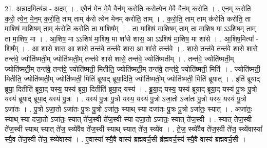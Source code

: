 \documentclass[17pt]{extarticle}
\begin{document}
21. अ॒न्ना॒दमित्य॑न्न - अ॒दम् । . ए॒वैन॑ मेन मे॒वै वैन॑म् करोति करोत्येन मे॒वै वैन॑म् करोति । . ए॒न॒म् क॒रो॒ति॒ क॒रो॒ त्ये॒न॒ मे॒न॒म् क॒रो॒ति॒ ताम् ताम् क॑रो त्येन मेनम् करोति॒ ताम् । . क॒रो॒ति॒ ताम् ताम् क॑रोति करोति॒ ता मा॒शिष॑ मा॒शिष॒म् ताम् क॑रोति करोति॒ ता मा॒शिष᳚म् । . ता मा॒शिष॑ मा॒शिष॒म् ताम् ता मा॒शिष॒ मा ऽऽशिष॒म् ताम् ता मा॒शिष॒ मा । . आ॒शिष॒ मा ऽऽशिष॑ मा॒शिष॒ मा शा॑से शास॒ आ ऽऽशिष॑ मा॒शिष॒ मा शा॑से । . आ॒शिष॒मित्या᳚ - शिष᳚म् । . आ शा॑से शास॒ आ शा॑से॒ तन्त॑वे॒ तन्त॑वे शास॒ आ शा॑से॒ तन्त॑वे । . शा॒से॒ तन्त॑वे॒ तन्त॑वे शासे शासे॒ तन्त॑वे॒ ज्योति॑ष्मती॒म् ज्योति॑ष्मती॒म् तन्त॑वे शासे शासे॒ तन्त॑वे॒ ज्योति॑ष्मतीम् । . तन्त॑वे॒ ज्योति॑ष्मती॒म् ज्योति॑ष्मती॒म् तन्त॑वे॒ तन्त॑वे॒ ज्योति॑ष्मती॒ मितीति॒ ज्योति॑ष्मती॒म् तन्त॑वे॒ तन्त॑वे॒ ज्योति॑ष्मती॒ मिति॑ । . ज्योति॑ष्मती॒ मितीति॒ ज्योति॑ष्मती॒म् ज्योति॑ष्मती॒ मिति॑ ब्रूयाद् ब्रूया॒दिति॒ ज्योति॑ष्मती॒म् ज्योति॑ष्मती॒ मिति॑ ब्रूयात् । . इति॑ ब्रूयाद् ब्रूया॒ दितीति॑ ब्रूया॒द् यस्य॒ यस्य॑ ब्रूया॒ दितीति॑ ब्रूया॒द् यस्य॑ । . ब्रू॒या॒द् यस्य॒ यस्य॑ ब्रूयाद् ब्रूया॒द् यस्य॑ पु॒त्रः पु॒त्रो यस्य॑ ब्रूयाद् ब्रूया॒द् यस्य॑ पु॒त्रः । . यस्य॑ पु॒त्रः पु॒त्रो यस्य॒ यस्य॑ पु॒त्रो ऽजा॒तो ऽजा॑तः पु॒त्रो यस्य॒ यस्य॑ पु॒त्रो ऽजा॑तः । . पु॒त्रो ऽजा॒तो ऽजा॑तः पु॒त्रः पु॒त्रो ऽजा॑तः॒ स्याथ् स्या दजा॑तः पु॒त्रः पु॒त्रो ऽजा॑तः॒ स्यात् । . अजा॑तः॒ स्याथ् स्या दजा॒तो ऽजा॑तः॒ स्यात् ते॑ज॒स्वी ते॑ज॒स्वी स्या दजा॒तो ऽजा॑तः॒ स्यात् ते॑ज॒स्वी । . स्यात् ते॑ज॒स्वी ते॑ज॒स्वी स्याथ् स्यात् ते॑ज॒ स्व्ये॑वैव ते॑ज॒स्वी स्याथ् स्यात् ते॑ज॒ स्व्ये॑व । . ते॒ज॒ स्व्ये॑वैव ते॑ज॒स्वी ते॑ज॒ स्व्ये॑वास्या᳚ स्यै॒व ते॑ज॒स्वी ते॑ज॒ स्व्ये॑वास्य॑ । . ए॒वास्या᳚ स्यै॒वै वास्य॑ ब्रह्मवर्च॒सी ब्र॑ह्मवर्च॒स्य॑ स्यै॒वै वास्य॑ ब्रह्मवर्च॒सी । \newline
\end{document}
